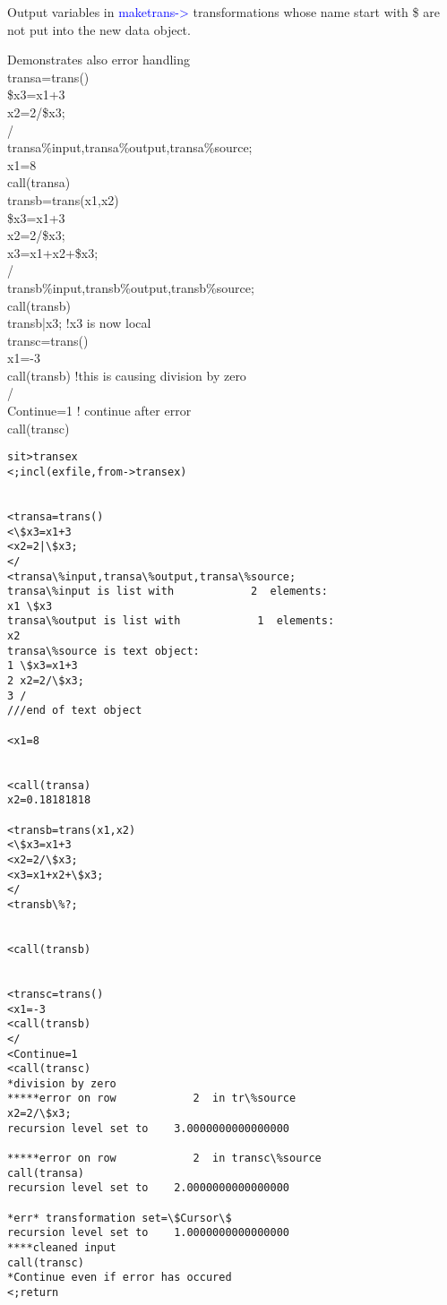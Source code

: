 \begin{note}
Output variables in \textcolor{blue}{maketrans->} transformations whose name start with \$ are not put into the new data object.
\end{note}
\begin{example}[transex]Demonstrates also error handling\\
\label{transex}
transa=\textcolor{VioletRed}{trans}()\\
\$x3=x1+3\\
x2=2/\$x3;\\
/\\
transa\%input,transa\%output,transa\%source;\\
x1=8\\
\textcolor{VioletRed}{call}(transa)\\
transb=\textcolor{VioletRed}{trans}(x1,x2)\\
\$x3=x1+3\\
x2=2/\$x3;\\
x3=x1+x2+\$x3;\\
/\\
transb\%input,transb\%output,transb\%source;\\
\textcolor{VioletRed}{call}(transb)\\
transb|x3;   !x3 is now local\\
transc=\textcolor{VioletRed}{trans}()\\
x1=-3\\
\textcolor{VioletRed}{call}(transb) !this is causing division by zero\\
/\\
Continue=1   ! continue after error\\
\textcolor{VioletRed}{call}(transc)
\end{example}
\color{Green}
\begin{verbatim}
sit>transex
<;incl(exfile,from->transex)


<transa=trans()
<\$x3=x1+3
<x2=2|\$x3;
</
<transa\%input,transa\%output,transa\%source;
transa\%input is list with            2  elements:
x1 \$x3
transa\%output is list with            1  elements:
x2
transa\%source is text object:
1 \$x3=x1+3
2 x2=2/\$x3;
3 /
///end of text object

<x1=8


<call(transa)
x2=0.18181818

<transb=trans(x1,x2)
<\$x3=x1+3
<x2=2/\$x3;
<x3=x1+x2+\$x3;
</
<transb\%?;


<call(transb)


<transc=trans()
<x1=-3
<call(transb)
</
<Continue=1
<call(transc)
*division by zero
*****error on row            2  in tr\%source
x2=2/\$x3;
recursion level set to    3.0000000000000000

*****error on row            2  in transc\%source
call(transa)
recursion level set to    2.0000000000000000

*err* transformation set=\$Cursor\$
recursion level set to    1.0000000000000000
****cleaned input
call(transc)
*Continue even if error has occured
<;return
\end{verbatim}
\color{Black}
